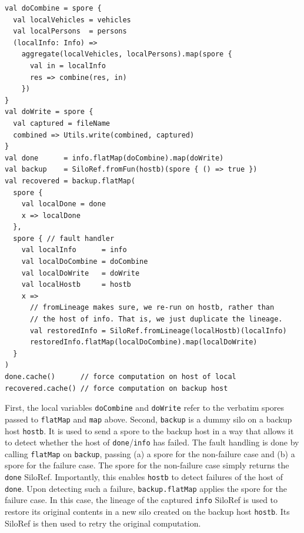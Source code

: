 \documentclass[preprint]{sigplanconf}
\theoremstyle{definition}
\theoremstyle{definition}
\begin{document}
\begin{lstlisting}
val doCombine = spore {
  val localVehicles = vehicles
  val localPersons  = persons
  (localInfo: Info) =>
    aggregate(localVehicles, localPersons).map(spore {
      val in = localInfo
      res => combine(res, in)
    })
}
val doWrite = spore {
  val captured = fileName
  combined => Utils.write(combined, captured)
}
val done      = info.flatMap(doCombine).map(doWrite)
val backup    = SiloRef.fromFun(hostb)(spore { () => true })
val recovered = backup.flatMap(
  spore {
    val localDone = done
    x => localDone
  },
  spore { // fault handler
    val localInfo      = info
    val localDoCombine = doCombine
    val localDoWrite   = doWrite
    val localHostb     = hostb
    x =>
      // fromLineage makes sure, we re-run on hostb, rather than
      // the host of info. That is, we just duplicate the lineage.
      val restoredInfo = SiloRef.fromLineage(localHostb)(localInfo)
      restoredInfo.flatMap(localDoCombine).map(localDoWrite)
  }
)
done.cache()      // force computation on host of local
recovered.cache() // force computation on backup host
\end{lstlisting}
\noindent

First, the local variables \verb|doCombine| and \verb|doWrite| refer to the
verbatim spores passed to \verb|flatMap| and \verb|map| above. Second,
\verb|backup| is a dummy silo on a backup host \verb|hostb|. It is used to send
a spore to the backup host in a way that allows it to detect whether the
host of \verb|done|/\verb|info| has failed. The fault handling is done by calling \verb|flatMap|
on \verb|backup|, passing (a) a spore for the non-failure case and (b) a spore for
the failure case. The spore for the non-failure case simply returns the
\verb|done| SiloRef. Importantly, this enables \verb|hostb| to detect failures
of the host of \verb|done|. Upon detecting such a failure, \verb|backup.flatMap|
applies the spore for the failure case. In this case, the lineage of the
captured \verb|info| SiloRef is used to restore its original contents in a new
silo created on the backup host \verb|hostb|. Its SiloRef is then used to retry
the original computation.
\end{document}
